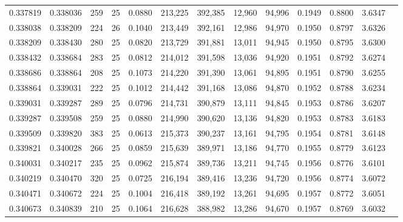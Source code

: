 \begin{tabular}{rrrrrrrrrrrrr}
0.337819 & 0.338036 &   259 &  25 &                                     0.0880 & 213,225 & 392,385 &  12,960 &  94,996 & 0.1949 & 0.8800 & 3.6347 \\
0.338038 & 0.338209 &   224 &  26 &                                     0.1040 & 213,449 & 392,161 &  12,986 &  94,970 & 0.1950 & 0.8797 & 3.6326 \\
0.338209 & 0.338430 &   280 &  25 &                                     0.0820 & 213,729 & 391,881 &  13,011 &  94,945 & 0.1950 & 0.8795 & 3.6300 \\
0.338432 & 0.338684 &   283 &  25 &                                     0.0812 & 214,012 & 391,598 &  13,036 &  94,920 & 0.1951 & 0.8792 & 3.6274 \\
0.338686 & 0.338864 &   208 &  25 &                                     0.1073 & 214,220 & 391,390 &  13,061 &  94,895 & 0.1951 & 0.8790 & 3.6255 \\
0.338864 & 0.339031 &   222 &  25 &                                     0.1012 & 214,442 & 391,168 &  13,086 &  94,870 & 0.1952 & 0.8788 & 3.6234 \\
0.339031 & 0.339287 &   289 &  25 &                                     0.0796 & 214,731 & 390,879 &  13,111 &  94,845 & 0.1953 & 0.8786 & 3.6207 \\
0.339287 & 0.339508 &   259 &  25 &                                     0.0880 & 214,990 & 390,620 &  13,136 &  94,820 & 0.1953 & 0.8783 & 3.6183 \\
0.339509 & 0.339820 &   383 &  25 &                                     0.0613 & 215,373 & 390,237 &  13,161 &  94,795 & 0.1954 & 0.8781 & 3.6148 \\
0.339821 & 0.340028 &   266 &  25 &                                     0.0859 & 215,639 & 389,971 &  13,186 &  94,770 & 0.1955 & 0.8779 & 3.6123 \\
0.340031 & 0.340217 &   235 &  25 &                                     0.0962 & 215,874 & 389,736 &  13,211 &  94,745 & 0.1956 & 0.8776 & 3.6101 \\
0.340219 & 0.340470 &   320 &  25 &                                     0.0725 & 216,194 & 389,416 &  13,236 &  94,720 & 0.1956 & 0.8774 & 3.6072 \\
0.340471 & 0.340672 &   224 &  25 &                                     0.1004 & 216,418 & 389,192 &  13,261 &  94,695 & 0.1957 & 0.8772 & 3.6051 \\
0.340673 & 0.340839 &   210 &  25 &                                     0.1064 & 216,628 & 388,982 &  13,286 &  94,670 & 0.1957 & 0.8769 & 3.6032 \\

\end{tabular}
